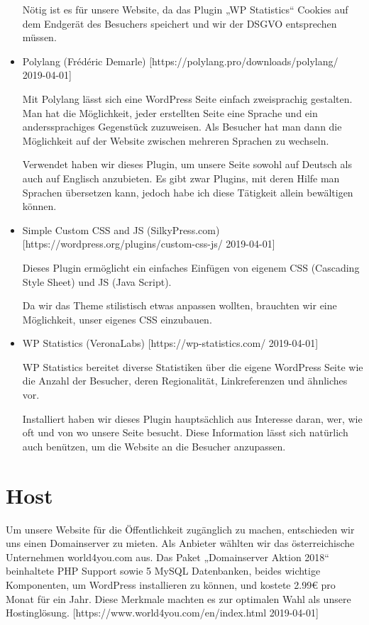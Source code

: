 \begin{itemize}
    Nötig ist es für unsere Website, da das Plugin „WP Statistics“ Cookies auf dem Endgerät des Besuchers speichert und wir der DSGVO entsprechen müssen.

    \item Polylang (Frédéric Demarle) [https://polylang.pro/downloads/polylang/ 2019-04-01]

    Mit Polylang lässt sich eine WordPress Seite einfach zweisprachig gestalten. Man hat die Möglichkeit, jeder erstellten Seite eine Sprache und ein anderssprachiges Gegenstück zuzuweisen. Als Besucher hat man dann die Möglichkeit auf der Website zwischen mehreren Sprachen zu wechseln.

    Verwendet haben wir dieses Plugin, um unsere Seite sowohl auf Deutsch als auch auf Englisch anzubieten. Es gibt zwar Plugins, mit deren Hilfe man Sprachen übersetzen kann, jedoch habe ich diese Tätigkeit allein bewältigen können.

    \item Simple Custom CSS and JS (SilkyPress.com) [https://wordpress.org/plugins/custom-css-js/ 2019-04-01]

    Dieses Plugin ermöglicht ein einfaches Einfügen von eigenem CSS (Cascading Style Sheet) und JS (Java Script).

    Da wir das Theme stilistisch etwas anpassen wollten, brauchten wir eine Möglichkeit, unser eigenes CSS einzubauen.

    \item WP Statistics (VeronaLabs) [https://wp-statistics.com/ 2019-04-01]

    WP Statistics bereitet diverse Statistiken über die eigene WordPress Seite wie die Anzahl der Besucher, deren Regionalität, Linkreferenzen und ähnliches vor.

    Installiert haben wir dieses Plugin hauptsächlich aus Interesse daran, wer, wie oft und von wo unsere Seite besucht. Diese Information lässt sich natürlich auch benützen, um die Website an die Besucher anzupassen.
\end{itemize}
\section{Host}
Um unsere Website für die Öffentlichkeit zugänglich zu machen, entschieden wir uns einen Domainserver zu mieten. Als Anbieter wählten wir das österreichische Unternehmen world4you.com aus. Das Paket „Domainserver Aktion 2018“ beinhaltete PHP Support sowie 5 MySQL Datenbanken, beides wichtige Komponenten, um WordPress installieren zu können, und kostete 2.99€ pro Monat für ein Jahr. Diese Merkmale machten es zur optimalen Wahl als unsere Hostinglösung. [https://www.world4you.com/en/index.html 2019-04-01]
